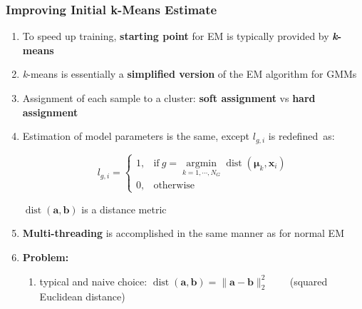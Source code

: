 \documentclass[usenames,dvipsnames]{beamer}
\DeclareMathOperator*{\argmin}{argmin}
\def\Vec#1{{\boldsymbol{#1}}}
\begin{document}
\begin{frame}
\frametitle{Improving Initial k-Means Estimate}

\begin{enumerate}[{~~$\boldsymbol{\bullet}$}]

\item
To speed up training, {\bf starting point} for EM is typically provided by \textbf{\textit{k}-means}
\vspace{0.5ex}

\item
{\it k}-means is essentially a {\bf simplified version} of the EM algorithm for GMMs
\vspace{0.5ex}

\item
Assignment of each sample to a cluster: {\bf soft assignment} vs {\bf hard assignment}
\vspace{0.5ex}

\item
Estimation of model parameters is the same, except $l_{g,i}$ is redefined~as:%

\vspace{-1.5ex}
\begin{minipage}{1\textwidth}
\begin{minipage}{0.5\textwidth}
\begin{equation*}
  l_{g,i} = \left\{
  \begin{array}{ll}
  1, & \mbox{if} ~ g = \argmin\limits_{k=1, \cdots, N_G} \operatorname{dist}(\Vec{\mu}_k, \Vec{x}_i) \\
  0, & \mbox{otherwise}
  \end{array}
  \right.
\end{equation*}%
\end{minipage}
\begin{minipage}{0.5\textwidth}
{$\operatorname{dist}(\Vec{a}, \Vec{b})$} is a distance metric
\end{minipage}
\end{minipage}
\vspace{0.5ex}


\item 
{\bf Multi-threading} is accomplished in the same manner as for normal EM
\vspace{0.5ex}

\item
{\bf Problem:}
\begin{enumerate}[{$\boldsymbol{\rightarrow}$}]
\renewcommand{\itemsep}{0.9ex}

\item
typical and naive choice:  $\operatorname{dist}(\Vec{a}, \Vec{b}) = \| \Vec{a} - \Vec{b} \|^{2}_{2}$   ~~~ (squared Euclidean distance)


\end{enumerate}
\end{enumerate}
\end{frame}
\end{document}
